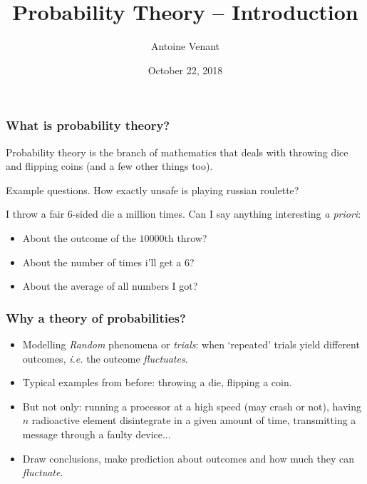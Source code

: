 \documentclass{beamer}
\begin{document}
\title{Probability Theory -- Introduction} 
\author{Antoine Venant}
\date{October 22, 2018}
\maketitle

\begin{frame}
  \frametitle{What is probability theory?}

  Probability theory is the branch of mathematics that deals with throwing dice and flipping coins (and a few other things too).\\

  \begin{exampleblock}{Example questions.}
    How exactly unsafe is playing russian roulette?
    
    I throw a fair $6$-sided die a million times. Can I say anything interesting \emph{a priori}:
    \begin{itemize}
    \item About the outcome of the $10000$th throw?
    \item About the number of times i'll get a $6$?
    \item About the average of all numbers I got?
    \end{itemize}
  \end{exampleblock}

  
\end{frame}


\begin{frame}
  \frametitle{Why a theory of probabilities?}
  
    \begin{itemize}
    \item Modelling \emph{Random} phenomena or \emph{trials}: when `repeated' trials yield different outcomes, \emph{i.e.} the outcome \emph{fluctuates}.
    \item Typical examples from before: throwing a die, flipping a coin.
    \item But not only: running a processor at a high speed (may crash or not), having $n$ radioactive element disintegrate in a given amount of time, transmitting a message through a faulty device...
    \item Draw conclusions, make prediction about outcomes and how much they can \emph{fluctuate}.
    \end{itemize}
    
\end{frame}
\end{document}
